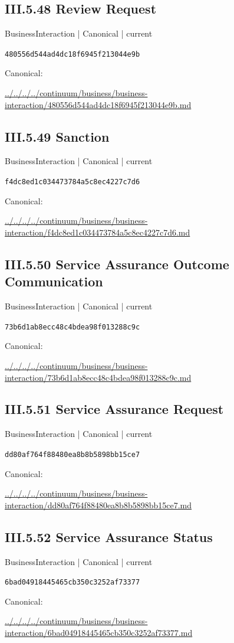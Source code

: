 \documentclass[10pt,a4paper]{article}
\begin{document}
\subsection*{III.5.48 Review Request}
{\small BusinessInteraction | Canonical | current}\par
\texttt{480556d544ad4dc18f6945f213044e9b}\par
Canonical: \par
{\footnotesize\url{../../../../continuum/business/business-interaction/480556d544ad4dc18f6945f213044e9b.md}}\par
\subsection*{III.5.49 Sanction}
{\small BusinessInteraction | Canonical | current}\par
\texttt{f4dc8ed1c034473784a5c8ec4227c7d6}\par
Canonical: \par
{\footnotesize\url{../../../../continuum/business/business-interaction/f4dc8ed1c034473784a5c8ec4227c7d6.md}}\par
\subsection*{III.5.50 Service Assurance Outcome Communication}
{\small BusinessInteraction | Canonical | current}\par
\texttt{73b6d1ab8ecc48c4bdea98f013288c9c}\par
Canonical: \par
{\footnotesize\url{../../../../continuum/business/business-interaction/73b6d1ab8ecc48c4bdea98f013288c9c.md}}\par
\subsection*{III.5.51 Service Assurance Request}
{\small BusinessInteraction | Canonical | current}\par
\texttt{dd80af764f88480ea8b8b5898bb15ce7}\par
Canonical: \par
{\footnotesize\url{../../../../continuum/business/business-interaction/dd80af764f88480ea8b8b5898bb15ce7.md}}\par
\subsection*{III.5.52 Service Assurance Status}
{\small BusinessInteraction | Canonical | current}\par
\texttt{6bad04918445465cb350c3252af73377}\par
Canonical: \par
{\footnotesize\url{../../../../continuum/business/business-interaction/6bad04918445465cb350c3252af73377.md}}\par
\end{document}
